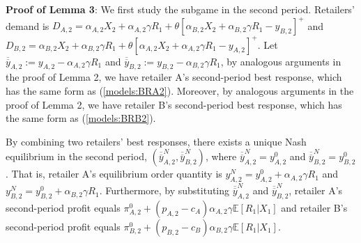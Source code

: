 \documentclass[nonblindrev,copyedit]{informs1}
\begin{document}
\begin{APPENDICES}
{\bf Proof of Lemma 3}: We first study the subgame in the second period. Retailers' demand is $D_{A,2}= \alpha_{A,2} X_2 + \alpha_{A,2} \gamma R_{1} + \theta \left[\alpha_{B,2} X_2 + \alpha_{B,2} \gamma R_{1} - y_{B,2} \right]^+$ and $D_{B,2} = \alpha_{B,2} X_2 + \alpha_{B,2} \gamma R_{1} + \theta \left[\alpha_{A,2} X_2 + \alpha_{A,2} \gamma R_{1} - y_{A,2} \right]^+$. Let $\overline{\overline{y}}_{A,2} := y_{A,2} - \alpha_{A,2} \gamma R_{1}$ and $\overline{\overline{y}}_{B,2} := y_{B,2} - \alpha_{B,2} \gamma R_{1}$, by analogous arguments in the proof of Lemma 2, we have retailer A's second-period best response, which has the same form as (\ref{models:BRA2}). Moreover, by analogous arguments in the proof of Lemma 2, we have retailer B's second-period best response, which has the same form as (\ref{models:BRB2}).

By combining two retailers' best responses, there exists a unique Nash equilibrium in the second period, $(\overline{\overline{y}}^N_{A,2},\overline{\overline{y}}^N_{B,2})$, where $\overline{\overline{y}}^N_{A,2} = y^0_{A,2}$ and $\overline{\overline{y}}^N_{B,2} = y^0_{B,2}$. That is, retailer A's equilibrium order quantity is $y^N_{A,2} = y^0_{A,2} + \alpha_{A,2} \gamma R_{1}$ and $y^N_{B,2} = y^0_{B,2} + \alpha_{B,2} \gamma R_{1}$. Furthermore, by substituting $\overline{\overline{y}}^N_{A,2}$ and $\overline{\overline{y}}^N_{B,2}$, retailer A's second-period profit equals $\pi^{0}_{A,2} + (p_{A,2} -c_A) \alpha_{A,2} \gamma \mathbb{E} \left[ R_{1} | X_1  \right]$ and retailer B's second-period profit equals $\pi^{0}_{B,2} + (p_{B,2} -c_B) \alpha_{B,2} \gamma \mathbb{E} \left[ R_{1} | X_1  \right]$.


\end{APPENDICES}
\end{document}
